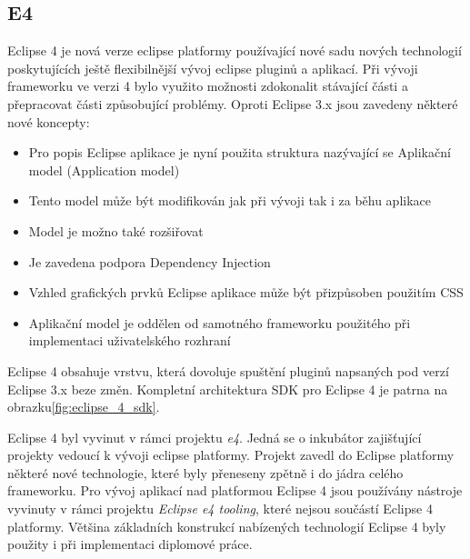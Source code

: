 \documentclass[ing,male,java,dept460]{diploma}		%
\begin{document}
\subsection{E4}
Eclipse 4 je nová verze eclipse platformy používající nové sadu nových technologií poskytujících ještě flexibilnější vývoj eclipse pluginů a aplikací. Při vývoji frameworku ve verzi 4 bylo využito možnosti zdokonalit stávající části a přepracovat části způsobující problémy. Oproti Eclipse 3.x jsou zavedeny některé nové koncepty:
\begin{itemize}
	\item Pro popis Eclipse aplikace je nyní použita struktura nazývající se Aplikační model (Application model)
	\item Tento model může být modifikován jak při vývoji tak i za běhu aplikace
	\item Model je možno také rozšiřovat
	\item Je zavedena podpora Dependency Injection
	\item Vzhled grafických prvků Eclipse aplikace může být přizpůsoben použitím CSS
	\item Aplikační model je oddělen od samotného frameworku použitého při implementaci uživatelského rozhraní
\end{itemize}
\par Eclipse 4 obsahuje vrstvu, která dovoluje spuštění pluginů napsaných pod verzí Eclipse 3.x beze změn. Kompletní architektura SDK pro Eclipse 4 je patrna na obrazku\ref{fig:eclipse_4_sdk}.

\par Eclipse 4 byl vyvinut v rámci projektu \textit{e4}. Jedná se o inkubátor zajišťující projekty vedoucí k vývoji eclipse platformy. Projekt zavedl do Eclipse platformy některé nové technologie, které byly přeneseny zpětně i do jádra celého frameworku. Pro vývoj aplikací nad platformou Eclipse 4 jsou používány nástroje vyvinuty v rámci projektu \textit{Eclipse e4 tooling}, které nejsou součástí Eclipse 4 platformy. Většina základních konstrukcí nabízených technologií Eclipse 4 byly použity i při implementaci diplomové práce.
\end{document}

